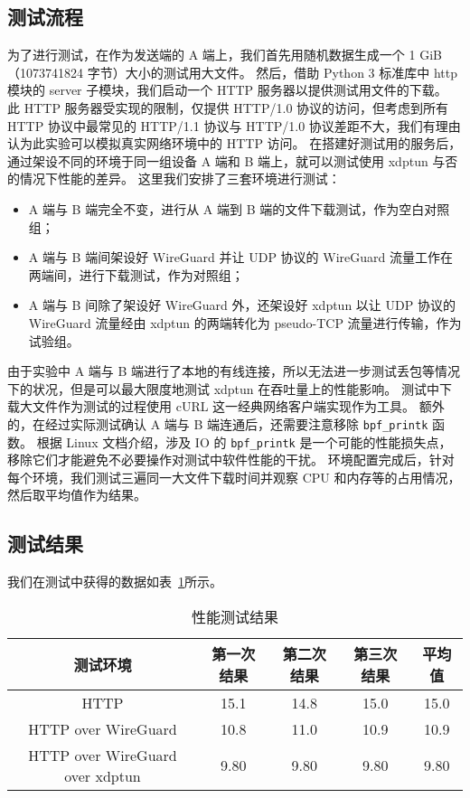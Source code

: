 \subsection{测试流程}

为了进行测试，在作为发送端的 A 端上，我们首先用随机数据生成一个 1 GiB（1073741824 字节）大小的测试用大文件。
然后，借助 Python 3 标准库中 http 模块的 server 子模块，我们启动一个 HTTP 服务器以提供测试用文件的下载。
此 HTTP 服务器受实现的限制，仅提供 HTTP/1.0 协议的访问，但考虑到所有 HTTP 协议中最常见的 HTTP/1.1 协议与 HTTP/1.0 协议差距不大，我们有理由认为此实验可以模拟真实网络环境中的 HTTP 访问。
在搭建好测试用的服务后，通过架设不同的环境于同一组设备 A 端和 B 端上，就可以测试使用 xdptun 与否的情况下性能的差异。
这里我们安排了三套环境进行测试：

\begin{itemize}
  \item A 端与 B 端完全不变，进行从 A 端到 B 端的文件下载测试，作为空白对照组；
  \item A 端与 B 端间架设好 WireGuard 并让 UDP 协议的 WireGuard 流量工作在两端间，进行下载测试，作为对照组；
  \item A 端与 B 间除了架设好 WireGuard 外，还架设好 xdptun 以让 UDP 协议的 WireGuard 流量经由 xdptun 的两端转化为 pseudo-TCP 流量进行传输，作为试验组。
\end{itemize}

由于实验中 A 端与 B 端进行了本地的有线连接，所以无法进一步测试丢包等情况下的状况，但是可以最大限度地测试 xdptun 在吞吐量上的性能影响。
测试中下载大文件作为测试的过程使用 cURL 这一经典网络客户端实现作为工具。
额外的，在经过实际测试确认 A 端与 B 端连通后，还需要注意移除 \texttt{bpf\_printk} 函数。
根据 Linux 文档介绍，涉及 IO 的 \texttt{bpf\_printk} 是一个可能的性能损失点，移除它们才能避免不必要操作对测试中软件性能的干扰。
环境配置完成后，针对每个环境，我们测试三遍同一大文件下载时间并观察 CPU 和内存等的占用情况，然后取平均值作为结果。

\subsection{测试结果}

我们在测试中获得的数据如表~\ref{tab:perf-test}所示。

\begin{table}[h]
  \centering
  \caption{性能测试结果}
  \label{tab:perf-test}
  \begin{tabular}{c c c c c}
    \toprule
    测试环境 & 第一次结果 & 第二次结果 & 第三次结果 & 平均值 \\
    \midrule
    HTTP & 15.1 & 14.8 & 15.0 & 15.0 \\
    HTTP over WireGuard & 10.8 & 11.0 & 10.9 & 10.9 \\
    HTTP over WireGuard over xdptun & 9.80 & 9.80 & 9.80 & 9.80 \\
    \bottomrule
  \end{tabular}
\end{table}

